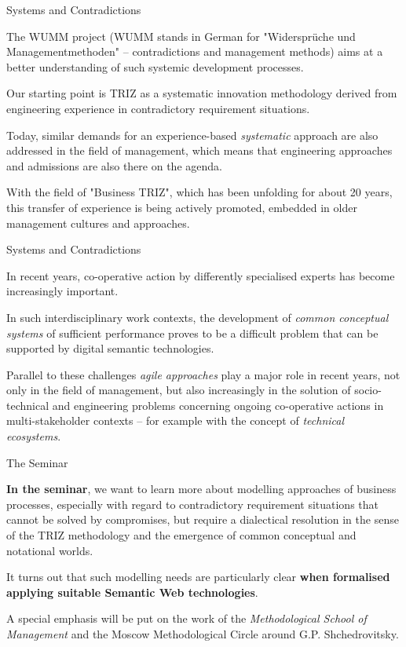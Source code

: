 \documentclass{beamer}
\begin{document}
\begin{frame}{Systems and Contradictions}\small

The WUMM project (WUMM stands in German for "Widersprüche und
Managementmethoden" -- contradictions and management methods) aims at a better
understanding of such systemic development processes.

Our starting point is TRIZ as a systematic innovation methodology derived from
engineering experience in contradictory requirement situations.

Today, similar demands for an experience-based \emph{systematic} approach are
also addressed in the field of management, which means that engineering
approaches and admissions are also there on the agenda.

With the field of "Business TRIZ", which has been unfolding for about 20
years, this transfer of experience is being actively promoted, embedded in
older management cultures and approaches.
\end{frame}

\begin{frame}{Systems and Contradictions}

In recent years, co-operative action by differently specialised experts has
become increasingly important.

In such interdisciplinary work contexts, the development of \emph{common
  conceptual systems} of sufficient performance proves to be a difficult
problem that can be supported by digital semantic technologies.

Parallel to these challenges \emph{agile approaches} play a major role in
recent years, not only in the field of management, but also increasingly in
the solution of socio-technical and engineering problems concerning ongoing
co-operative actions in multi-stakeholder contexts -- for example with the
concept of \emph{technical ecosystems}.
\end{frame}

\begin{frame}{The Seminar}

\textbf{In the seminar}, we want to learn more about modelling approaches of
business processes, especially with regard to contradictory requirement
situations that cannot be solved by compromises, but require a dialectical
resolution in the sense of the TRIZ methodology and the emergence of common
conceptual and notational worlds. 

It turns out that such modelling needs are particularly clear \textbf{when
  formalised applying suitable Semantic Web technologies}.

A special emphasis will be put on the work of the \emph{Methodological School
  of Management} and the Moscow Methodological Circle around
G.P. Shchedrovitsky.
\end{frame}
\end{document}
